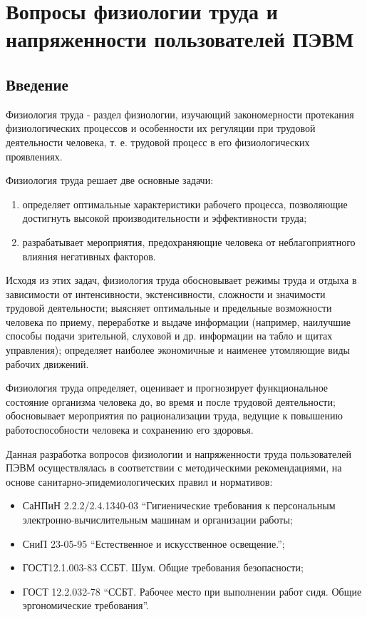 \section{Вопросы физиологии труда и напряженности пользователей ПЭВМ}
\subsection{Введение}
Физиология труда - раздел физиологии, изучающий закономерности протекания физиологических процессов и особенности их регуляции при трудовой деятельности человека, т. е. трудовой процесс в его физиологических проявлениях. 

Физиология труда решает две основные задачи:
\begin{enumerate}
\item определяет оптимальные характеристики рабочего процесса, позволяющие достигнуть высокой производительности и эффективности труда;
\item разрабатывает мероприятия, предохраняющие человека от неблагоприятного влияния негативных факторов.
\end{enumerate}

Исходя из этих задач, физиология труда обосновывает режимы труда и отдыха в зависимости от интенсивности, экстенсивности, сложности и значимости трудовой деятельности; выясняет оптимальные и предельные возможности человека по приему, переработке и выдаче информации (например, наилучшие способы подачи зрительной, слуховой и др. информации на табло и щитах управления); определяет наиболее экономичные и наименее утомляющие виды рабочих движений.

Физиология труда определяет, оценивает и прогнозирует функциональное состояние организма человека до, во время и после трудовой деятельности; обосновывает мероприятия по рационализации труда, ведущие к повышению работоспособности человека и сохранению его здоровья.

Данная разработка вопросов физиологии и напряженности труда пользователей ПЭВМ осуществлялась в соответствии с методическими рекомендациями, на основе санитарно-эпидемиологических правил и нормативов:
\begin{itemize}
\item СаНПиН 2.2.2/2.4.1340-03 “Гигиенические требования к персональным электронно-вычислительным машинам и организации работы;
\item СниП 23-05-95 “Естественное и искусственное освещение.”;
\item ГОСТ12.1.003-83 ССБТ. Шум. Общие требования безопасности;
\item ГОСТ 12.2.032-78 “ССБТ. Рабочее место при выполнении работ сидя. Общие эргономические требования”.
\end{itemize}

